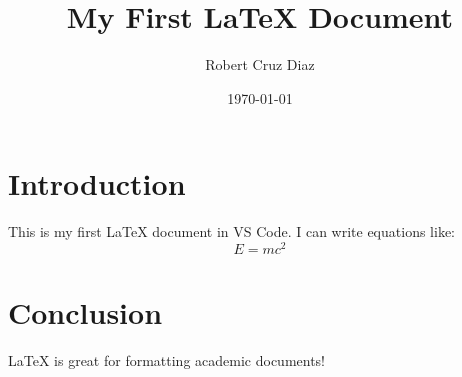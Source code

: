 \documentclass{article}
\begin{document}
\title{My First LaTeX Document}
\author{Robert Cruz Diaz}
\date{\today}

\maketitle

\section{Introduction}
This is my first LaTeX document in VS Code. I can write equations like:
\[
    E = mc^2
\]

\section{Conclusion}
LaTeX is great for formatting academic documents!
\end{document}
